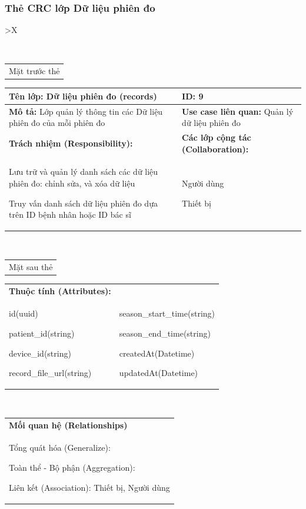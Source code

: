 \cleardoublepage

\subsubsection{Thẻ CRC lớp Dữ liệu phiên đo}

\begin{xltabular}{\textwidth}{
		>{\centering\arraybackslash}X
	}
	\caption{\bfseries \fontsize{12pt}{0pt}\selectfont Thẻ CRC lớp Dữ liệu phiên đo}
	\\
	\begin{tabularx}{0.9\textwidth}{X}
		Mặt trước thẻ
	\end{tabularx}
	\begin{tabularx}{0.9\textwidth}{|X|X|}
		\hline
		\textbf{Tên lớp:} Dữ liệu phiên đo (records)                                & \textbf{ID:} 9                                         \\
		\hline
		\textbf{Mô tả:} Lớp quản lý thông tin các Dữ liệu phiên đo của mỗi phiên đo & \textbf{Use case liên quan:}  Quản lý dữ liệu phiên đo \\
		\hline
		\textbf{Trách nhiệm (Responsibility):}                                      & \textbf{Các lớp cộng tác (Collaboration):}             \\
		Lưu trữ và quản lý danh sách các dữ liệu phiên đo: chỉnh sửa, và xóa dữ liệu

		Truy vấn danh sách dữ liệu phiên đo dựa trên ID bệnh nhân hoặc ID bác sĩ
		                                                                            &
		Người dùng

		Thiết bị
		\\
		\hline
	\end{tabularx}
	\\
	\begin{tabularx}{0.9\textwidth}{X}
		Mặt sau thẻ
	\end{tabularx}
	\begin{tabularx}{0.9\textwidth}{|X|X|}
		\hline
		\textbf{Thuộc tính (Attributes):} & \\
		id(uuid)

		patient\_id(string)

		device\_id(string)

		record\_file\_url(string)
		                                  &
		season\_start\_time(string)

		season\_end\_time(string)

		createdAt(Datetime)

		updatedAt(Datetime)
		\\ \hline
	\end{tabularx}
	\\
	\begin{tabularx}{0.9\textwidth}{|X|}
		\hline
		\textbf{Mối quan hệ (Relationships)} \\
		Tổng quát hóa (Generalize):

		Toàn thể - Bộ phận (Aggregation):

		Liên kết (Association): Thiết bị, Người dùng
		\\
		\hline
	\end{tabularx}
\end{xltabular}

